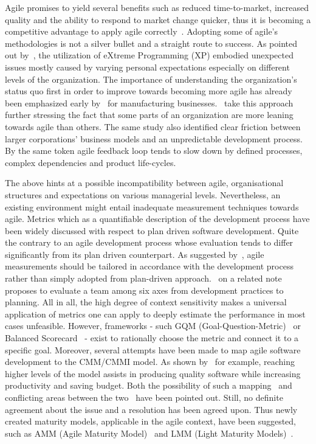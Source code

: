 \documentclass[paper=a4, fontsize=11pt]{scrartcl}
\numberwithin{equation}{section}		%
\numberwithin{figure}{section}			%
\numberwithin{table}{section}			%
\begin{document}
Agile promises to yield several benefits such as reduced time-to-market, increased quality and the ability to respond to market change quicker, thus it is becoming a competitive advantage to apply agile correctly~\citep{schwaber2007agile}. Adopting some of agile's methodologies is not a silver bullet and a straight route to success. As pointed out by~\citet{grenning2001xp}, the utilization of eXtreme Programming (XP) embodied unexpected issues mostly caused by varying personal expectations especially on different levels of the organization. The importance of understanding the organization's status quo first in order to improve towards becoming more agile has already been emphasized early by~\citet{zhang1999manufacturing} for manufacturing businesses.~\citet{kettunen2008agileorg} take this approach further stressing the fact that some parts of an organization are more leaning towards agile than others. The same study also identified clear friction between larger corporations' business models and an unpredictable development process. By the same token agile feedback loop tends to slow down by defined processes, complex dependencies and product life-cycles.

The above hints at a possible incompatibility between agile, organisational structures and expectations on various managerial levels. Nevertheless, an existing environment might entail inadequate measurement techniques towards agile. Metrics which as a quantifiable description of the development process have been widely discussed with respect to plan driven software development. Quite the contrary to an agile development process whose evaluation tends to differ significantly from its plan driven counterpart. As suggested by~\citet{hartmann2006appagilemes}, agile measurements should be tailored in accordance with the development process rather than simply adopted from plan-driven approach.~\citet{leffingwell2007scalelargecorps} on a related note proposes to evaluate a team among six axes from development practices to planning. All in all, the high degree of context sensitivity makes a universal application of metrics one can apply to deeply estimate the performance in most cases unfeasible. However, frameworks - such GQM (Goal-Question-Metric)~\citep{victor1994gqm} or Balanced Scorecard~\citep{kaplan1991balancesc} - exist to rationally choose the metric and connect it to a specific goal. Moreover, several attempts have been made to map agile software development to the CMM/CMMI model. As shown by~\citet{pitterman2000maturity} for example, reaching higher levels of the model assists in producing quality software while increasing productivity and saving budget. Both the possibility of such a mapping~\citep{paulk2011xpcmm} and conflicting areas between the two~\citep{turner2002agilecmmi} have been pointed out. Still, no definite agreement about the issue and a resolution has been agreed upon. Thus newly created maturity models, applicable in the agile context, have been suggested, such as AMM (Agile Maturity Model)~\citep{chetankumar2009amm} and LMM (Light Maturity Models)~\citep{buglione2011lmm}.
\end{document}
